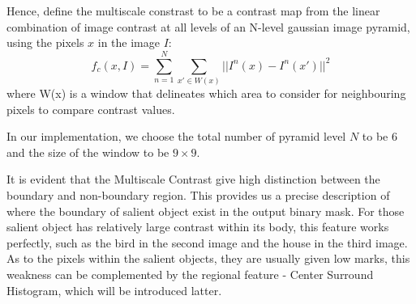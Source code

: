 \documentclass[10pt,twocolumn,letterpaper]{article}
\newcommand{\SUM}{\sum\limits}
\begin{document}
Hence, define the multiscale constrast to be 
a contrast map from the linear combination of image contrast at all levels of an N-level
gaussian image pyramid, using the pixels $x$ in the image $I$:
    $$
    f_c(x,I) = \SUM_{n = 1}^{N}\SUM_{x'\in W(x)}||I^n(x)-I^n(x')||^2
    $$
where W(x) is a window that delineates which area to consider for neighbouring pixels to compare contrast values.

In our implementation, we choose the total number of pyramid level $N$ to be $6$ and 
the size of the window to be $9 \times 9$. 

It is evident that the Multiscale Contrast give high distinction between the boundary and non-boundary region. 
This provides us a precise description of where the boundary of salient object exist in the output binary mask.
For those salient object has relatively large contrast within its body, this feature works perfectly, such as 
the bird in the second image and the house in the third image. 
As to the pixels within the salient objects, they are usually given low marks, this weakness can be complemented
by the regional feature - Center Surround Histogram, which will be introduced latter.
\end{document}
